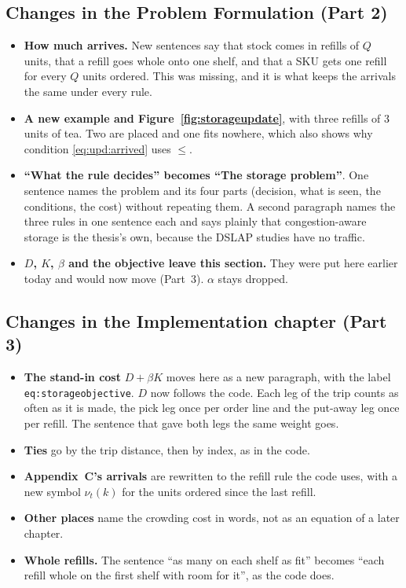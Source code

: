 \documentclass[11pt,a4paper]{article}
\begin{document}
\subsection*{Changes in the Problem Formulation (Part 2)}
\begin{itemize}[leftmargin=1.2em]
\item \textbf{How much arrives.} New sentences say that stock comes in
refills of $Q$ units, that a refill goes whole onto one shelf, and that a SKU
gets one refill for every $Q$ units ordered. This was missing, and it is
what keeps the arrivals the same under every rule.
\item \textbf{A new example and Figure~\ref{fig:storageupdate}}, with three
refills of 3 units of tea. Two are placed and one fits nowhere, which also
shows why condition \eqref{eq:upd:arrived} uses $\le$.
\item \textbf{``What the rule decides'' becomes ``The storage problem''}. One
sentence names the problem and its four parts (decision, what is seen, the
conditions, the cost) without repeating them. A second paragraph names the
three rules in one sentence each and says plainly that congestion-aware
storage is the thesis's own, because the DSLAP studies have no traffic.
\item \textbf{$D$, $K$, $\beta$ and the objective leave this section.} They
were put here earlier today and would now move (Part~3). $\alpha$ stays
dropped.
\end{itemize}
\subsection*{Changes in the Implementation chapter (Part 3)}
\begin{itemize}[leftmargin=1.2em]
\item \textbf{The stand-in cost} $D + \beta K$ moves here as a new paragraph,
with the label \texttt{eq:storageobjective}. $D$ now follows the code. Each
leg of the trip counts as often as it is made, the pick leg once per order
line and the put-away leg once per refill. The sentence that gave both legs
the same weight goes.
\item \textbf{Ties} go by the trip distance, then by index, as in the code.
\item \textbf{Appendix~C's arrivals} are rewritten to the refill rule the code
uses, with a new symbol $\nu_t(k)$ for the units ordered since the last
refill.
\item \textbf{Other places} name the crowding cost in words, not as an
equation of a later chapter.
\item \textbf{Whole refills.} The sentence ``as many on each shelf as fit''
becomes ``each refill whole on the first shelf with room for it'', as the
code does.
\end{itemize}
\end{document}
